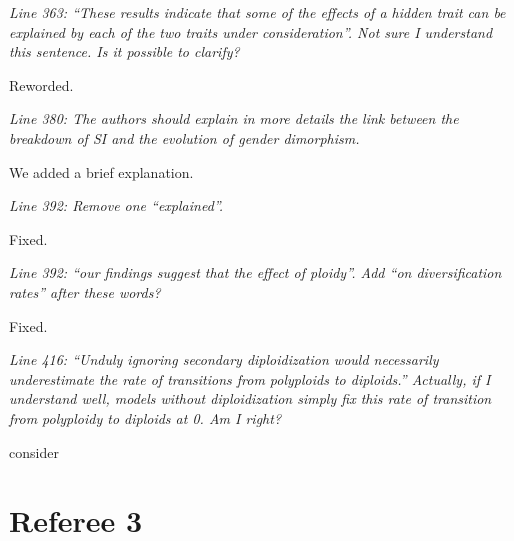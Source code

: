 \documentclass[11pt]{article}
\renewenvironment{quote}{\bigskip\noindent\itshape\ignorespaces}{\smallskip}
\begin{document}
\begin{quote}
Line 363: ``These results indicate that some of the effects of a hidden trait can be explained by each of the two traits under consideration''.
Not sure I understand this sentence. Is it possible to clarify?
\end{quote}

Reworded.

\begin{quote}
Line 380: The authors should explain in more details the link between the breakdown of SI and the evolution of gender dimorphism.
\end{quote}

We added a brief explanation.

\begin{quote}
Line 392: Remove one ``explained''.
\end{quote}

Fixed.

\begin{quote}
Line 392: ``our findings suggest that the effect of ploidy''.
Add ``on diversification rates'' after these words?
\end{quote}

Fixed.

\begin{quote}
Line 416: ``Unduly ignoring secondary diploidization would necessarily underestimate the rate of transitions from polyploids to diploids.''
Actually, if I understand well, models without diploidization simply fix this rate of transition from polyploidy to diploids at 0.
Am I right?
\end{quote}

consider %

\section{Referee 3}
\vspace{-11pt}
\end{document}
